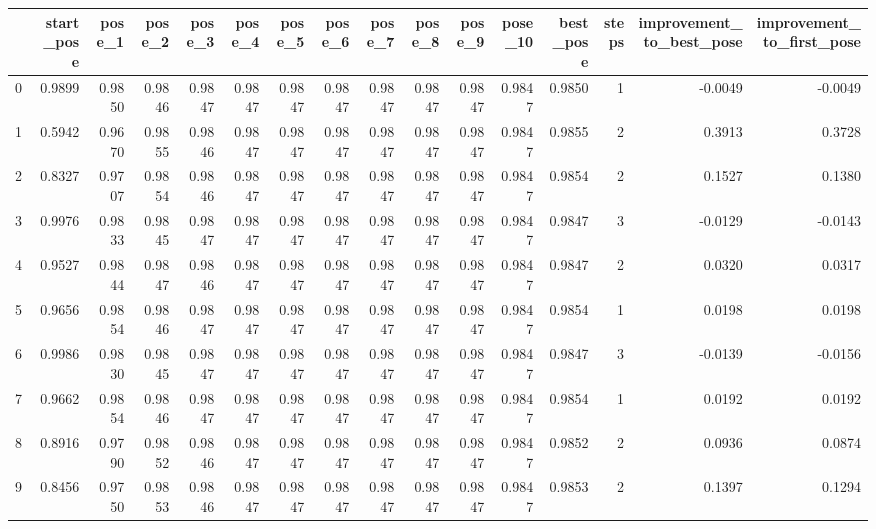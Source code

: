 \begin{tabular}{lrrrrrrrrrrrrrrr}
\toprule
{} &  start\_pose &  pose\_1 &  pose\_2 &  pose\_3 &  pose\_4 &  pose\_5 &  pose\_6 &  pose\_7 &  pose\_8 &  pose\_9 &  pose\_10 &  best\_pose &  steps &  improvement\_to\_best\_pose &  improvement\_to\_first\_pose \\
\midrule
0   &      0.9899 &  0.9850 &  0.9846 &  0.9847 &  0.9847 &  0.9847 &  0.9847 &  0.9847 &  0.9847 &  0.9847 &   0.9847 &     0.9850 &      1 &                   -0.0049 &                    -0.0049 \\
1   &      0.5942 &  0.9670 &  0.9855 &  0.9846 &  0.9847 &  0.9847 &  0.9847 &  0.9847 &  0.9847 &  0.9847 &   0.9847 &     0.9855 &      2 &                    0.3913 &                     0.3728 \\
2   &      0.8327 &  0.9707 &  0.9854 &  0.9846 &  0.9847 &  0.9847 &  0.9847 &  0.9847 &  0.9847 &  0.9847 &   0.9847 &     0.9854 &      2 &                    0.1527 &                     0.1380 \\
3   &      0.9976 &  0.9833 &  0.9845 &  0.9847 &  0.9847 &  0.9847 &  0.9847 &  0.9847 &  0.9847 &  0.9847 &   0.9847 &     0.9847 &      3 &                   -0.0129 &                    -0.0143 \\
4   &      0.9527 &  0.9844 &  0.9847 &  0.9846 &  0.9847 &  0.9847 &  0.9847 &  0.9847 &  0.9847 &  0.9847 &   0.9847 &     0.9847 &      2 &                    0.0320 &                     0.0317 \\
5   &      0.9656 &  0.9854 &  0.9846 &  0.9847 &  0.9847 &  0.9847 &  0.9847 &  0.9847 &  0.9847 &  0.9847 &   0.9847 &     0.9854 &      1 &                    0.0198 &                     0.0198 \\
6   &      0.9986 &  0.9830 &  0.9845 &  0.9847 &  0.9847 &  0.9847 &  0.9847 &  0.9847 &  0.9847 &  0.9847 &   0.9847 &     0.9847 &      3 &                   -0.0139 &                    -0.0156 \\
7   &      0.9662 &  0.9854 &  0.9846 &  0.9847 &  0.9847 &  0.9847 &  0.9847 &  0.9847 &  0.9847 &  0.9847 &   0.9847 &     0.9854 &      1 &                    0.0192 &                     0.0192 \\
8   &      0.8916 &  0.9790 &  0.9852 &  0.9846 &  0.9847 &  0.9847 &  0.9847 &  0.9847 &  0.9847 &  0.9847 &   0.9847 &     0.9852 &      2 &                    0.0936 &                     0.0874 \\
9   &      0.8456 &  0.9750 &  0.9853 &  0.9846 &  0.9847 &  0.9847 &  0.9847 &  0.9847 &  0.9847 &  0.9847 &   0.9847 &     0.9853 &      2 &                    0.1397 &                     0.1294 \\

\end{tabular}
